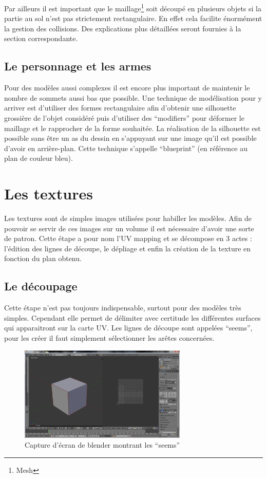 \documentclass[11pt]{report}
\begin{document}
Par ailleurs il est important que le maillage\footnote{Mesh} soit découpé en plusieurs objets si la partie au sol n'est pas strictement rectangulaire. En effet cela facilite énormément la gestion des collisions. Des explications plus détaillées seront fournies à la section correspondante.

\subsection{Le personnage et les armes}

Pour des modèles aussi complexes il est encore plus important de maintenir le nombre de sommets aussi bas que possible. Une technique de modélisation pour y arriver est d’utiliser des formes rectangulaire afin d’obtenir une silhouette grossière de l’objet considéré puis d’utiliser des ``modifiers'' pour déformer le maillage et le rapprocher de la forme souhaitée. La réalisation de la silhouette est possible sans être un as du dessin en s’appuyant sur une image qu’il est possible d’avoir en arrière-plan. Cette technique s’appelle ``blueprint'' (en référence au plan de couleur bleu).

\section{Les textures}

Les textures sont de simples images utilisées pour habiller les modèles. Afin de pouvoir se servir de ces images sur un volume il est nécessaire d’avoir une sorte de patron. Cette étape a pour nom l’UV mapping et se décompose en 3 actes : l’édition des lignes de découpe, le dépliage et enfin la création de la texture en fonction du plan obtenu.

\subsection{Le découpage}

Cette étape n’est pas toujours indispensable, surtout pour des modèles très simples. Cependant elle permet de délimiter avec certitude les différentes surfaces qui apparaitront sur la carte UV. Les lignes de découpe sont appelées ``seems'', pour les créer il faut simplement sélectionner les arêtes concernées. 

\begin{figure}[htbp]
\centering
\includegraphics[width=8cm]{seems.png}
\caption{Capture d'écran de blender montrant les ``seems''}
\end{figure}
\end{document}
